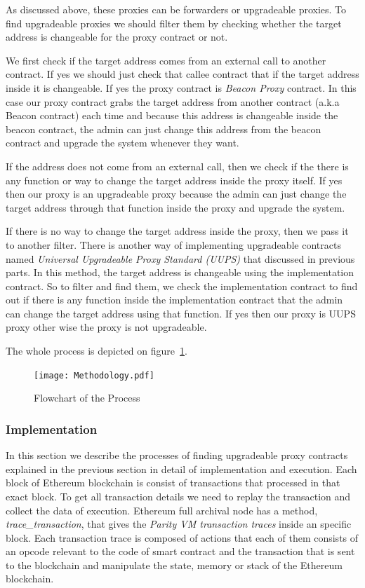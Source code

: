 As discussed above, these proxies can be forwarders or upgradeable proxies. To find upgradeable proxies we should filter them by checking whether the target address is changeable for the proxy contract or not.

We first check if the target address comes from an external call to another contract. If yes we should just check that callee contract that if the target address inside it is changeable. If yes the proxy contract is \textit{Beacon Proxy} contract. In this case our proxy contract grabs the target address from another contract (a.k.a Beacon contract) each time and because this address is changeable inside the beacon contract, the admin can just change this address from the beacon contract and upgrade the system whenever they want.

If the address does not come from an external call, then we check if the there is any function or way to change the target address inside the proxy itself. If yes then our proxy is an upgradeable proxy because the admin can just change the target address through that function inside the proxy and upgrade the system.

If there is no way to change the target address inside the proxy, then we pass it to another filter. There is another way of implementing upgradeable contracts named \textit{Universal Upgradeable Proxy Standard (UUPS)} that discussed in previous parts. In this method, the target address is changeable using the implementation contract. So to filter and find them, we check the implementation contract to find out if there is any function inside the implementation contract that the admin can change the target address using that function. If yes then our proxy is UUPS proxy other wise the proxy is not upgradeable.

The whole process is depicted on figure~\ref{flowchart}.

\begin{figure}[t]
  \texttt{[image: Methodology.pdf]}\label{flowchart}
  \caption{Flowchart of the Process}
\end{figure}


\subsubsection{Implementation}\label{findingProxies}
In this section we describe the processes of finding upgradeable proxy contracts explained in the previous section in detail of implementation and execution. 
Each block of Ethereum blockchain is consist of transactions that processed in that exact block. To get all transaction details we need to replay the transaction and collect the data of execution. Ethereum full archival node has a method, \textit{trace\_transaction},  that gives the \textit{Parity VM transaction traces} inside an specific block. Each transaction trace is composed of actions that each of them consists of an opcode relevant to the code of smart contract and the transaction that is sent to the blockchain and manipulate the state, memory or stack of the Ethereum blockchain. 

